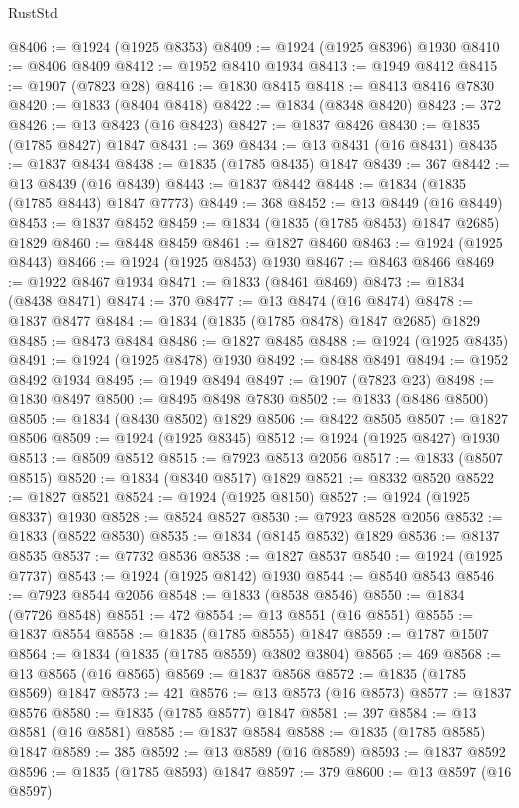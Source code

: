 \begin{lexlean}{RustStd}
\begin{coremodule}
@8406 := @1924 (@1925 @8353)
@8409 := @1924 (@1925 @8396) @1930
@8410 := @8406 @8409
@8412 := @1952 @8410 @1934
@8413 := @1949 @8412
@8415 := @1907 (@7823 @28)
@8416 := @1830 @8415
@8418 := @8413 @8416 @7830
@8420 := @1833 (@8404 @8418)
@8422 := @1834 (@8348 @8420)
@8423 := 372
@8426 := @13 @8423 (@16 @8423)
@8427 := @1837 @8426
@8430 := @1835 (@1785 @8427) @1847
@8431 := 369
@8434 := @13 @8431 (@16 @8431)
@8435 := @1837 @8434
@8438 := @1835 (@1785 @8435) @1847
@8439 := 367
@8442 := @13 @8439 (@16 @8439)
@8443 := @1837 @8442
@8448 := @1834 (@1835 (@1785 @8443) @1847 @7773)
@8449 := 368
@8452 := @13 @8449 (@16 @8449)
@8453 := @1837 @8452
@8459 := @1834 (@1835 (@1785 @8453) @1847 @2685) @1829
@8460 := @8448 @8459
@8461 := @1827 @8460
@8463 := @1924 (@1925 @8443)
@8466 := @1924 (@1925 @8453) @1930
@8467 := @8463 @8466
@8469 := @1922 @8467 @1934
@8471 := @1833 (@8461 @8469)
@8473 := @1834 (@8438 @8471)
@8474 := 370
@8477 := @13 @8474 (@16 @8474)
@8478 := @1837 @8477
@8484 := @1834 (@1835 (@1785 @8478) @1847 @2685) @1829
@8485 := @8473 @8484
@8486 := @1827 @8485
@8488 := @1924 (@1925 @8435)
@8491 := @1924 (@1925 @8478) @1930
@8492 := @8488 @8491
@8494 := @1952 @8492 @1934
@8495 := @1949 @8494
@8497 := @1907 (@7823 @23)
@8498 := @1830 @8497
@8500 := @8495 @8498 @7830
@8502 := @1833 (@8486 @8500)
@8505 := @1834 (@8430 @8502) @1829
@8506 := @8422 @8505
@8507 := @1827 @8506
@8509 := @1924 (@1925 @8345)
@8512 := @1924 (@1925 @8427) @1930
@8513 := @8509 @8512
@8515 := @7923 @8513 @2056
@8517 := @1833 (@8507 @8515)
@8520 := @1834 (@8340 @8517) @1829
@8521 := @8332 @8520
@8522 := @1827 @8521
@8524 := @1924 (@1925 @8150)
@8527 := @1924 (@1925 @8337) @1930
@8528 := @8524 @8527
@8530 := @7923 @8528 @2056
@8532 := @1833 (@8522 @8530)
@8535 := @1834 (@8145 @8532) @1829
@8536 := @8137 @8535
@8537 := @7732 @8536
@8538 := @1827 @8537
@8540 := @1924 (@1925 @7737)
@8543 := @1924 (@1925 @8142) @1930
@8544 := @8540 @8543
@8546 := @7923 @8544 @2056
@8548 := @1833 (@8538 @8546)
@8550 := @1834 (@7726 @8548)
@8551 := 472
@8554 := @13 @8551 (@16 @8551)
@8555 := @1837 @8554
@8558 := @1835 (@1785 @8555) @1847
@8559 := @1787 @1507
@8564 := @1834 (@1835 (@1785 @8559) @3802 @3804)
@8565 := 469
@8568 := @13 @8565 (@16 @8565)
@8569 := @1837 @8568
@8572 := @1835 (@1785 @8569) @1847
@8573 := 421
@8576 := @13 @8573 (@16 @8573)
@8577 := @1837 @8576
@8580 := @1835 (@1785 @8577) @1847
@8581 := 397
@8584 := @13 @8581 (@16 @8581)
@8585 := @1837 @8584
@8588 := @1835 (@1785 @8585) @1847
@8589 := 385
@8592 := @13 @8589 (@16 @8589)
@8593 := @1837 @8592
@8596 := @1835 (@1785 @8593) @1847
@8597 := 379
@8600 := @13 @8597 (@16 @8597)

\end{coremodule}
\end{lexlean}
